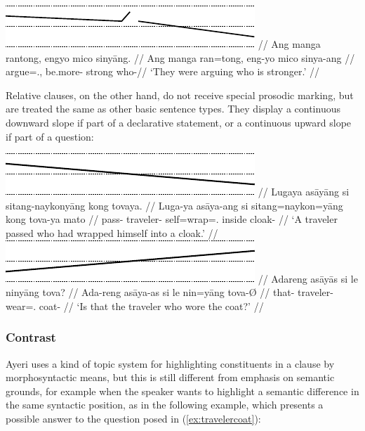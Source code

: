 \ex\begingl
	\glpreamble \raisebox{-1.5em}
		{\includegraphics{images/contours-complement.pdf}} //
	\gla Ang manga rantong, engyo mico sinyāng. //
	\glb Ang manga ran=tong, eng-yo mico sinya-ang //
	\glc \AgtT{} \Prog{} argue=\TplN{}.\Aarg{}, be.more-\TsgN{} strong
		who-\Aarg{}//
	\glft `They were arguing who is stronger.' //
\endgl\xe

Relative clauses, on the other hand, do not receive 
special prosodic marking, but are treated the same as other basic sentence 
types. They display a continuous downward slope if part of a 
declarative statement, or a continuous upward slope if part of a question:

\pex[belowexskip=0em]
\a\begingl
	\glpreamble \raisebox{-1.5em}
		{\includegraphics{images/contours-statement.pdf}} //
	\gla Lugaya asāyāng si sitang-naykonyāng kong tovaya. //
	\glb Luga-ya asāya-ang si sitang=naykon=yāng kong tova-ya mato //
	\glc pass-\TsgM{} traveler-\Aarg{} \Rel{} self=wrap=\TsgM{}.\Aarg{} 
		inside cloak-\Loc{} //
	\glft `A traveler passed who had wrapped himself into a cloak.' //
\endgl
\\

\a\label{ex:travelercoat}\begingl
	\glpreamble \raisebox{-1.5em}
		{\includegraphics{images/contours-ynquestion.pdf}} //
	\gla Adareng asāyās si le ninyāng tova? //
	\glb Ada-reng asāya-as si le nin=yāng tova-Ø //
	\glc that-\AargI{} traveler-\Parg{} \Rel{} \PatTI{} wear=\TsgM{}.\Aarg{} 
		coat-\Top{} //
	\glft `Is that the traveler who wore the coat?' //
\endgl
\xe

\subsubsection{Contrast}

Ayeri uses a kind of topic system for highlighting constituents in 
a clause by morphosyntactic means, but this is still different from emphasis on 
semantic grounds, for example when the speaker wants to highlight a 
semantic difference in the same syntactic position, as in the following example, 
which presents a possible answer to the question posed in 
(\ref{ex:travelercoat}):

